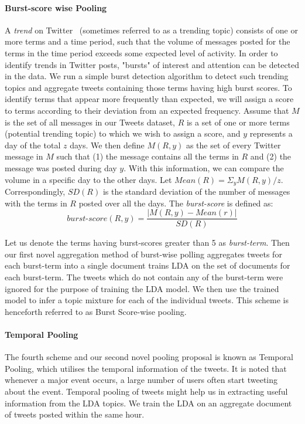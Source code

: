 \documentclass{sig-alternate}
\begin{document}
\paragraph{Burst-score wise Pooling}
A \textit{trend} on Twitter~\cite{mor} (sometimes referred to as a trending
topic) consists of one or more terms and a time period, such that the
volume of messages posted for the terms in the time period exceeds
some expected level of activity.  In order to identify trends in
Twitter posts, "bursts" of interest and attention can be detected in
the data. We run a simple burst detection algorithm to detect such
trending topics and aggregate tweets containing those terms having
high burst scores.  To identify terms that appear more frequently than
expected, we will assign a score to terms according to their deviation
from an expected frequency. Assume that $M$ is the set of all messages
in our Tweets dataset, $R$ is a set of one or more terms (potential trending topic) to which we wish to assign a score, and $y$ represents a day of the total $z$
days. We then define $M(R, y)$ as the set of every Twitter message in
$M$ such that (1) the message contains all the terms in $R$ and (2)
the message was posted during day $y$. With this information, we can
compare the volume in a specific day to the other days. Let $ Mean(R)
= \Sigma_y M(R,y) / z $.  Correspondingly, $ SD(R) $ is the standard
deviation of the number of messages with the terms in $R$ posted over
all the days. The \textit{burst-score} is defined as:
\[
\mathit{burst\textrm{-}score}(R,y) = \frac{|M(R,y) - Mean(r)|}{SD(R)} 
\]

Let us denote the terms having burst-scores greater than 5 as
\textit{burst-term}.  Then our first novel aggregation method of
burst-wise polling aggregates tweets for each burst-term into a single
document trains LDA on the set of documents for each burst-term. The
tweets which do not contain any of the burst-term were ignored for the
purpose of training the LDA model. We then use the trained model to
infer a topic mixture for each of the individual tweets. This scheme is henceforth referred to as Burst Score-wise pooling.

\paragraph{Temporal Pooling} 
The fourth scheme and our second novel pooling proposal is known as
Temporal Pooling, which utilises the temporal information of the tweets. It
is noted that whenever a major event occurs, a large number of users
often start tweeting about the event. Temporal pooling of tweets might help
us in extracting useful information from the LDA topics. We train the
LDA on an aggregate document of tweets posted within the same hour.
\end{document}

